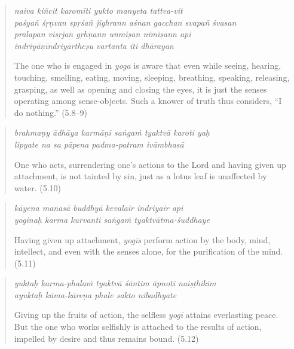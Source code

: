 \documentclass[12pt, twoside, openright]{memoir}
\begin{document}
\par
\begin{verse}
\textit{naiva kiñcit karomīti yukto manyeta tattva-vit} \\
\textit{paśyañ śṛṇvan spṛśañ jighrann aśnan gacchan svapañ śvasan} \\
\textit{pralapan visṛjan gṛhṇann unmiṣan nimiṣann api} \\
\textit{indriyāṇīndriyārtheṣu vartanta iti dhārayan}

\noindent The one who is engaged in \textit{yoga} is aware that even while seeing, hearing, touching, smelling, eating, moving, sleeping, breathing, speaking, releasing, grasping, as well as opening and closing the eyes, it is just the senses operating among sense-objects. Such a knower of truth thus considers, \enquote{I do nothing.} (5.8–9)
\end{verse}
\par



\par
\begin{verse}
\textit{brahmaṇy ādhāya karmāṇi saṅgaṁ tyaktvā karoti yaḥ} \\
\textit{lipyate na sa pāpena padma-patram ivāmbhasā}

\noindent One who acts, surrendering one’s actions to the Lord and having given up attachment, is not tainted by sin, just as a lotus leaf is unaffected by water. (5.10)
\end{verse}
\par



\par
\begin{verse}
\textit{kāyena manasā buddhyā kevalair indriyair api} \\
\textit{yoginaḥ karma kurvanti saṅgaṁ tyaktvātma-śuddhaye}

\noindent Having given up attachment, \textit{yogīs} perform action by the body, mind, intellect, and even with the senses alone, for the purification of the mind. (5.11)
\end{verse}
\par



\par
\begin{verse}
\textit{yuktaḥ karma-phalaṁ tyaktvā śāntim āpnoti naiṣṭhikīm} \\
\textit{ayuktaḥ kāma-kāreṇa phale sakto nibadhyate}

\noindent Giving up the fruits of action, the selfless \textit{yogī} attains everlasting peace. But the one who works selfishly is attached to the results of action, impelled by desire and thus remains bound. (5.12)
\end{verse}
\par
\end{document}
